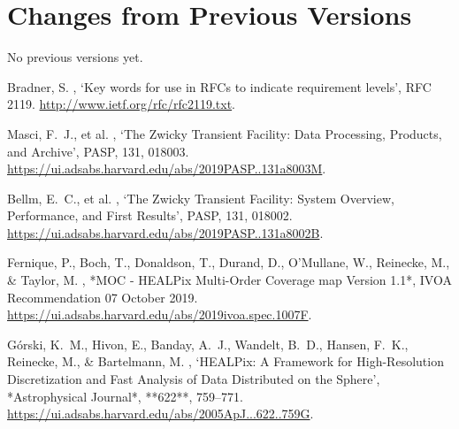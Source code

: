 \documentclass[11pt,a4paper]{ivoa}
\begin{document}
\appendix
\section{Changes from Previous Versions}
No previous versions yet.

% 
\begin{thebibliography}{}

Bradner, S.  \harvardyearright , `Key words for use in
  {RFCs} to indicate requirement levels', RFC 2119.
\newblock \url{http://www.ietf.org/rfc/rfc2119.txt}.

Masci, F.~J., et al. \harvardyearright,
`The Zwicky Transient Facility: Data Processing, Products, and Archive',
PASP, 131, 018003. \url{https://ui.adsabs.harvard.edu/abs/2019PASP..131a8003M}.

Bellm, E.~C., et al. \harvardyearright,
`The Zwicky Transient Facility: System Overview, Performance, and First Results',
PASP, 131, 018002. \url{https://ui.adsabs.harvard.edu/abs/2019PASP..131a8002B}.

Fernique, P., Boch, T., Donaldson, T., Durand, D., O'Mullane, W., Reinecke, M., \& Taylor, M.  
\harvardyearright,  
*MOC - HEALPix Multi-Order Coverage map Version 1.1*,  
IVOA Recommendation 07 October 2019.  
\url{https://ui.adsabs.harvard.edu/abs/2019ivoa.spec.1007F}.

G{\'o}rski, K.~M., Hivon, E., Banday, A.~J., Wandelt, B.~D., Hansen, F.~K., Reinecke, M., \& Bartelmann, M.  
\harvardyearright,  
`HEALPix: A Framework for High-Resolution Discretization and Fast Analysis of Data Distributed on the Sphere',  
*Astrophysical Journal*, **622**, 759–771.  
\url{https://ui.adsabs.harvard.edu/abs/2005ApJ...622..759G}.

\end{thebibliography}
\end{document}
